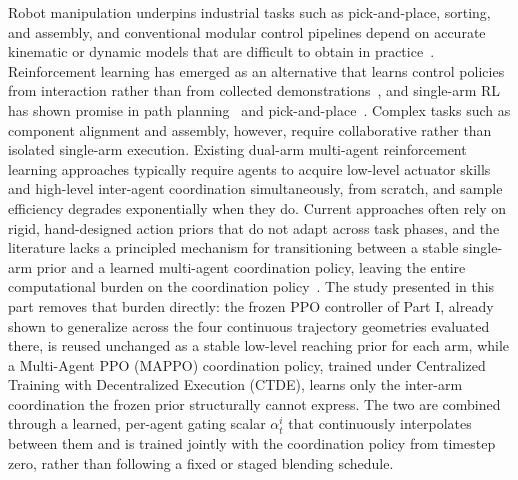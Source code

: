 Robot manipulation underpins industrial tasks such as pick-and-place, sorting, and assembly, and
conventional modular control pipelines depend on accurate kinematic or dynamic models that are
difficult to obtain in practice~\citep{trajec_conv}. Reinforcement learning has emerged as an
alternative that learns control policies from interaction rather than from collected
demonstrations~\citep{liu2026review}, and single-arm RL has shown promise in path
planning~\citep{hemalatha2026cleannav} and pick-and-place~\citep{dahmani2025reinforcement}. Complex
tasks such as component alignment and assembly, however, require collaborative rather than isolated
single-arm execution. Existing dual-arm multi-agent reinforcement learning approaches typically require agents to acquire
low-level actuator skills and high-level inter-agent coordination simultaneously, from scratch, and
sample efficiency degrades exponentially when they do. Current approaches often rely on rigid,
hand-designed action priors that do not adapt across task phases, and the literature lacks a
principled mechanism for transitioning between a stable single-arm prior and a learned multi-agent
coordination policy, leaving the entire computational burden on the coordination
policy~\citep{sk2026priorguided}. The study presented in this part removes that burden directly: the
frozen PPO controller of Part I, already shown to generalize across the four continuous trajectory
geometries evaluated there, is reused unchanged as a stable low-level reaching prior for each arm, while a
Multi-Agent PPO (MAPPO) coordination policy, trained under Centralized Training with Decentralized
Execution (CTDE), learns only the inter-arm coordination the frozen prior structurally cannot
express. The two are combined through a learned, per-agent gating scalar $\alpha_t^i$ that
continuously interpolates between them and is trained jointly with the coordination policy from
timestep zero, rather than following a fixed or staged blending schedule.


